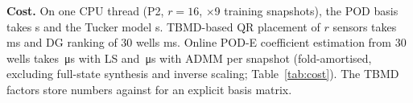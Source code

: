 \textbf{Cost.} On one CPU thread (P2, $r=16$, \NT{}$\times$9 training snapshots), the POD basis takes \CostPodSvd{} s and the Tucker model \CostTucker{} s. TBMD-based QR placement of $r$ sensors takes \CostQr{} ms and DG ranking of 30 wells \CostBlockDg{} ms. Online POD-E coefficient estimation from 30 wells takes \CostLsWell{}\,\si{\micro\second} with LS and \CostLoneWell{}\,\si{\micro\second} with ADMM per snapshot (fold-amortised, excluding full-state synthesis and inverse scaling; Table~\ref{tab:cost}). The TBMD factors store \TbmdStorage{} numbers against \BasisStorage{} for an explicit basis matrix.




